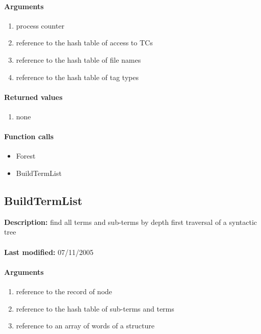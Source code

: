 \paragraph{Arguments}
\begin{enumerate}
\item process counter
\item reference to the hash table of access to TCs
\item reference to the hash table of file names
\item reference to the hash table of tag types
\end{enumerate}

\paragraph{Returned values}
\begin{enumerate}
\item none
\end{enumerate}

\paragraph{Function calls}
\begin{itemize}
\item Forest
\item BuildTermList
\end{itemize}

\subsection{BuildTermList}
\textbf{Description:} find all terms and sub-terms by depth first traversal of a syntactic tree\\
\\\textbf{Last modified:} 07/11/2005

\paragraph{Arguments}
\begin{enumerate}
\item reference to the record of node
\item reference to the hash table of sub-terms and terms
\item reference to an array of words of a structure
\end{enumerate}

